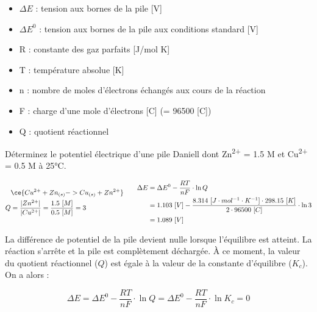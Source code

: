 \documentclass[
  11pt,
  a4paper,
  openany]{book}
\providecommand{\tightlist}{%
  \setlength{\itemsep}{0pt}\setlength{\parskip}{0pt}}
\begin{document}
\begin{itemize}
\tightlist
\item
  \(\Delta E\) : tension aux bornes de la pile {[}V{]}
\item
  \(\Delta E^{0}\) : tension aux bornes de la pile aux conditions standard {[}V{]}
\item
  R : constante des gaz parfaits {[}J/mol K{]}
\item
  T : température absolue {[}K{]}
\item
  n : nombre de moles d'électrons échangés aux cours de la réaction
\item
  F : charge d'une mole d'électrons {[}C{]} (= 96500 {[}C{]})
\item
  Q : quotient réactionnel
\end{itemize}

\clearpage

\begin{Exercise}

Déterminez le potentiel électrique d'une pile Daniell dont \textbar Zn\textsuperscript{2+}\textbar{} = 1.5 M et \textbar Cu\textsuperscript{2+}\textbar{} = 0.5 M à 25°C.


\end{Exercise}

\begin{Answer}
\[
\begin{split}
  & \ce{Cu^{2+} + Zn_{(s)} -> Cu_{(s)} + Zn^{2+}} \\
  Q &= \frac{|Zn^{2+}|}{|Cu^{2+}|} = \frac{1.5\ [M]}{0.5\ [M]} = 3
\end{split}
\qquad
\begin{split}
  \Delta E &= \Delta E^{0} - \frac{RT}{nF} \cdot \ln{Q} \\
  &= 1.103\ [V] - \frac{8.314\ [J \cdot mol^{-1} \cdot K^{-1}] \cdot 298.15\ [K]}{2 \cdot 96500\ [C]} \cdot \ln{3} \\
  &= 1.089\ [V]
\end{split}
\]

\end{Answer}

La différence de potentiel de la pile devient nulle lorsque l'équilibre est atteint. La réaction s'arrête et la pile est complètement déchargée. À ce moment, la valeur du quotient réactionnel (\(Q\)) est égale à la valeur de la constante d'équilibre (\(K_c\)). On a alors :

\[
\Delta E = \Delta E^{0} - \frac{RT}{nF} \cdot \ln{Q} = \Delta E^{0} - \frac{RT}{nF} \cdot \ln{K_{c}} = 0
\]
\end{document}
